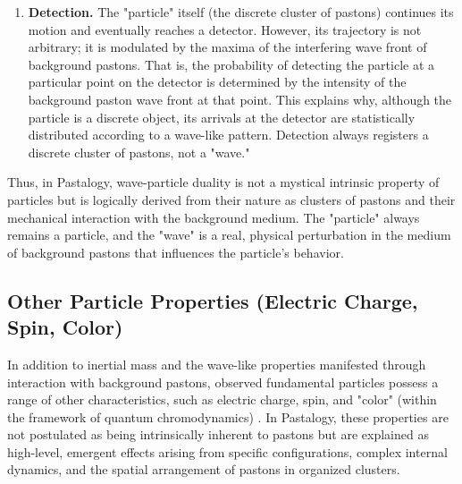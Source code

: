 \documentclass[pdflatex,sn-mathphys-num]{sn-jnl}
\begin{document}
\begin{enumerate}
    \item \textbf{Detection.} The "particle" itself (the discrete cluster of pastons) continues its motion and eventually reaches a detector. However, its trajectory is not arbitrary; it is modulated by the maxima of the interfering wave front of background pastons. That is, the probability of detecting the particle at a particular point on the detector is determined by the intensity of the background paston wave front at that point. This explains why, although the particle is a discrete object, its arrivals at the detector are statistically distributed according to a wave-like pattern. Detection always registers a discrete cluster of pastons, not a "wave."
\end{enumerate}

Thus, in Pastalogy, wave-particle duality is not a mystical intrinsic property of particles but is logically derived from their nature as clusters of pastons and their mechanical interaction with the background medium. The "particle" always remains a particle, and the "wave" is a real, physical perturbation in the medium of background pastons that influences the particle's behavior.

\subsection{Other Particle Properties (Electric Charge, Spin, Color)}\label{subsec:particle-properties}

In addition to inertial mass and the wave-like properties manifested through interaction with background pastons, observed fundamental particles possess a range of other characteristics, such as electric charge, spin, and "color" (within the framework of quantum chromodynamics) \cite{pdg2024}. In Pastalogy, these properties are not postulated as being intrinsically inherent to pastons but are explained as high-level, emergent effects arising from specific configurations, complex internal dynamics, and the spatial arrangement of pastons in organized clusters.
\end{document}
